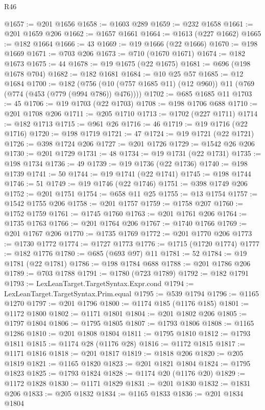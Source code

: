 \begin{lexlean}{R46}
\begin{coremodule}
@1657 := @201 @1656
@1658 := @1603 @289
@1659 := @232 @1658
@1661 := @201 @1659 @206
@1662 := @1657 @1661
@1664 := @1613 (@227 @1662)
@1665 := @182 @1664
@1666 := 43
@1669 := @19 @1666 (@22 @1666)
@1670 := @198 @1669
@1671 := @703 @206
@1673 := @710 (@1670 @1671)
@1674 := @182 @1673
@1675 := 44
@1678 := @19 @1675 (@22 @1675)
@1681 := @696 (@198 @1678 @704)
@1682 := @182 @1681
@1684 := @10 @25 @57
@1685 := @12 @1684
@1700 := @182
    (@756 (@10 (@757 @1685 @11) (@12 @960)) @11 (@769 (@774 (@453 (@779 (@994 @786)) @476))))
@1702 := @685 @1685 @11
@1703 := 45
@1706 := @19 @1703 (@22 @1703)
@1708 := @198 @1706 @688
@1710 := @201 @1708 @206
@1711 := @205 @1710
@1713 := @1702 (@227 @1711)
@1714 := @182 @1713
@1715 := @961 @26
@1716 := 46
@1719 := @19 @1716 (@22 @1716)
@1720 := @198 @1719
@1721 := 47
@1724 := @19 @1721 (@22 @1721)
@1726 := @398 @1724 @206
@1727 := @201 @1726
@1729 := @1542 @26 @206
@1730 := @201 @1729
@1731 := 48
@1734 := @19 @1731 (@22 @1731)
@1735 := @198 @1734
@1736 := 49
@1739 := @19 @1736 (@22 @1736)
@1740 := @198 @1739
@1741 := 50
@1744 := @19 @1741 (@22 @1741)
@1745 := @198 @1744
@1746 := 51
@1749 := @19 @1746 (@22 @1746)
@1751 := @398 @1749 @206
@1752 := @201 @1751
@1754 := @658 @11 @25
@1755 := @13 @1754
@1757 := @1542 @1755 @206
@1758 := @201 @1757
@1759 := @1758 @207
@1760 := @1752 @1759
@1761 := @1745 @1760
@1763 := @201 @1761 @206
@1764 := @1735 @1763
@1766 := @201 @1764 @206
@1767 := @1740 @1766
@1769 := @201 @1767 @206
@1770 := @1735 @1769
@1772 := @201 @1770 @206
@1773 := @1730 @1772
@1774 := @1727 @1773
@1776 := @1715 (@1720 @1774)
@1777 := @182 @1776
@1780 := @685 (@693 @97) @11
@1781 := 52
@1784 := @19 @1781 (@22 @1781)
@1786 := @198 @1784 @688
@1788 := @201 @1786 @206
@1789 := @703 @1788
@1791 := @1780 (@723 @1789)
@1792 := @182 @1791
@1793 := LexLeanTarget.TargetSyntax.Expr.cond
@1794 := LexLeanTarget.TargetSyntax.Prim.equal
@1795 := @539 @1794
@1796 := @1165 @1270
@1797 := @201 @1796
@1800 := @1174 @185 (@1176 @185)
@1801 := @1172 @1800
@1802 := @1171 @1801
@1804 := @201 @1802 @206
@1805 := @1797 @1804
@1806 := @1795 @1805
@1807 := @1793 @1806
@1808 := @1165 @1286
@1810 := @201 @1808 @1804
@1811 := @1795 @1810
@1812 := @1793 @1811
@1815 := @1174 @28 (@1176 @28)
@1816 := @1172 @1815
@1817 := @1171 @1816
@1818 := @201 @1817
@1819 := @1818 @206
@1820 := @205 @1819
@1821 := @1165 @1820
@1823 := @201 @1821 @1804
@1824 := @1795 @1823
@1825 := @1793 @1824
@1828 := @1174 @20 (@1176 @20)
@1829 := @1172 @1828
@1830 := @1171 @1829
@1831 := @201 @1830
@1832 := @1831 @206
@1833 := @205 @1832
@1834 := @1165 @1833
@1836 := @201 @1834 @1804

\end{coremodule}
\end{lexlean}
